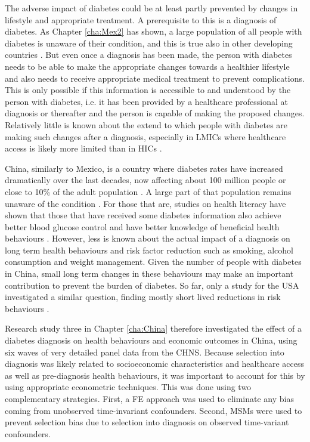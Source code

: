 The adverse impact of diabetes could be at least partly prevented by changes in lifestyle and appropriate treatment. A prerequisite to this is a diagnosis of diabetes. As Chapter \ref{cha:Mex2} has shown, a large population of all people with diabetes is unaware of their condition, and this is true also in other developing countries \parencite{Beagley2014}. But even once a diagnosis has been made, the person with diabetes needs to be able to make the appropriate changes towards a healthier lifestyle and also needs to receive appropriate medical treatment to prevent complications. This is only possible if this information is accessible to and understood by the person with diabetes, i.e. it has been provided by a healthcare professional at diagnosis or thereafter and the person is capable of making the proposed changes. Relatively little is known about the extend to which people with diabetes are making such changes after a diagnosis, especially in \acp{LMIC} where healthcare access is likely more limited than in \acp{HIC} \parencite{Mills2014}.

China, similarly to Mexico, is a country where diabetes rates have increased dramatically over the last decades, now affecting about 100 million people or close to 10\% of the adult population \parencite{Risk2016}. A large part of that population remains unaware of the condition \parencite{Wang2015}. For those that are, studies on health literacy have shown that those that have received some diabetes information also achieve better blood glucose control and have better knowledge of beneficial health behaviours \parencite{Guo2012}. However, less is known about the actual impact of a diagnosis on long term health behaviours and risk factor reduction such as smoking, alcohol consumption and weight management. Given the number of people with diabetes in China, small long term changes in these behaviours may make an important contribution to prevent the burden of diabetes. So far, only a study for the USA investigated a similar question, finding mostly short lived reductions in risk behaviours \parencite{Slade2012}. 

Research study three in Chapter \ref{cha:China} therefore investigated the effect of a diabetes diagnosis on health behaviours and economic outcomes in China, using six waves of very detailed panel data from the \ac{CHNS}. Because selection into diagnosis was likely related to socioeconomic characteristics and healthcare access as well as pre-diagnosis health behaviours, it was important to account for this by using appropriate econometric techniques. This was done using two complementary strategies. First, a \ac{FE} approach was used to eliminate any bias coming from unobserved time-invariant confounders. Second, \acp{MSM} were used to prevent selection bias due to selection into diagnosis on observed time-variant confounders.

